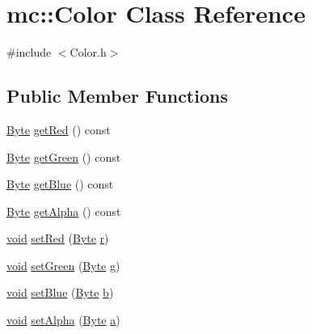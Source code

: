 \hypertarget{classmc_1_1_color}{}\section{mc\+:\+:Color Class Reference}
\label{classmc_1_1_color}


{\ttfamily \#include $<$Color.\+h$>$}

\subsection*{Public Member Functions}
\begin{DoxyCompactItemize}
\item 
\hyperlink{namespacemc_a64bc4fa1f43bc4da5c7ac98c04c863e8}{Byte} \hyperlink{classmc_1_1_color_a45fc6165528af4e8c4c878fbb43434eb}{get\+Red} () const 
\item 
\hyperlink{namespacemc_a64bc4fa1f43bc4da5c7ac98c04c863e8}{Byte} \hyperlink{classmc_1_1_color_acd7f870b8763b4bf4e9004363615ebd4}{get\+Green} () const 
\item 
\hyperlink{namespacemc_a64bc4fa1f43bc4da5c7ac98c04c863e8}{Byte} \hyperlink{classmc_1_1_color_af1a18db8e721f537d8aa3d61b6a38fae}{get\+Blue} () const 
\item 
\hyperlink{namespacemc_a64bc4fa1f43bc4da5c7ac98c04c863e8}{Byte} \hyperlink{classmc_1_1_color_a424a22022102a0fac492623319df49ff}{get\+Alpha} () const 
\item 
\hyperlink{_s_d_l__opengles2__gl2ext_8h_ae5d8fa23ad07c48bb609509eae494c95}{void} \hyperlink{classmc_1_1_color_a2c402622da696c33778dd1116383de6d}{set\+Red} (\hyperlink{namespacemc_a64bc4fa1f43bc4da5c7ac98c04c863e8}{Byte} \hyperlink{_s_d_l__opengl_8h_a42ce7cdc612e53abee15043f80220d97}{r})
\item 
\hyperlink{_s_d_l__opengles2__gl2ext_8h_ae5d8fa23ad07c48bb609509eae494c95}{void} \hyperlink{classmc_1_1_color_ae34ebd62353042648e84efd705163d96}{set\+Green} (\hyperlink{namespacemc_a64bc4fa1f43bc4da5c7ac98c04c863e8}{Byte} \hyperlink{_s_d_l__opengl__glext_8h_acaceb3a655ff28b75259860bcb868f9f}{g})
\item 
\hyperlink{_s_d_l__opengles2__gl2ext_8h_ae5d8fa23ad07c48bb609509eae494c95}{void} \hyperlink{classmc_1_1_color_ad8ba9328b871cc8d08785b6ad03d4d2c}{set\+Blue} (\hyperlink{namespacemc_a64bc4fa1f43bc4da5c7ac98c04c863e8}{Byte} \hyperlink{_s_d_l__opengl__glext_8h_a0f71581a41fd2264c8944126dabbd010}{b})
\item 
\hyperlink{_s_d_l__opengles2__gl2ext_8h_ae5d8fa23ad07c48bb609509eae494c95}{void} \hyperlink{classmc_1_1_color_a9c82e480305368648a769b212508ae44}{set\+Alpha} (\hyperlink{namespacemc_a64bc4fa1f43bc4da5c7ac98c04c863e8}{Byte} \hyperlink{_s_d_l__opengl__glext_8h_a3309789fc188587d666cda5ece79cf82}{a})

\end{DoxyCompactItemize}
